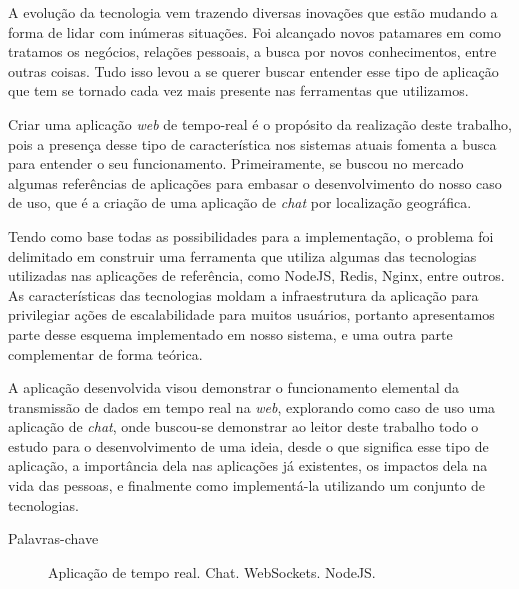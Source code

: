 \documentclass[brazil,ruledheader]{abntifes}
\begin{document}
	\begin{resumo}
		A evolução da tecnologia vem trazendo diversas inovações que estão mudando a forma de lidar com inúmeras situações. Foi alcançado novos patamares em como tratamos os negócios, relações pessoais, a busca por novos conhecimentos, entre outras coisas. Tudo isso levou a se querer buscar entender esse tipo de aplicação que tem se tornado cada vez mais presente nas ferramentas que utilizamos.
		
		Criar uma aplicação \textit{web} de tempo-real é o propósito da realização deste trabalho, pois a presença desse tipo de característica nos sistemas atuais fomenta a busca para entender o seu funcionamento. Primeiramente, se buscou no mercado algumas referências de aplicações para embasar o desenvolvimento do nosso caso de uso, que é a criação de uma aplicação de \textit{chat} por localização geográfica.
		
		Tendo como base todas as possibilidades para a implementação, o problema foi delimitado em construir uma ferramenta que utiliza algumas das tecnologias utilizadas nas aplicações de referência, como NodeJS, Redis, Nginx, entre outros. As características das tecnologias moldam a infraestrutura da aplicação para privilegiar ações de escalabilidade para muitos usuários, portanto apresentamos parte desse esquema implementado em nosso sistema, e uma outra parte complementar de forma teórica. 
		
		A aplicação desenvolvida visou demonstrar o funcionamento elemental da transmissão de dados em tempo real na \textit{web}, explorando como caso de uso uma aplicação de \textit{chat}, onde buscou-se demonstrar ao leitor deste trabalho todo o estudo para o desenvolvimento de uma ideia, desde o que significa esse tipo de aplicação, a importância dela nas aplicações já existentes, os impactos dela na vida das pessoas, e finalmente como implementá-la utilizando um conjunto de tecnologias.
		
		\begin{description}
			\item[Palavras-chave] Aplicação de tempo real. Chat. WebSockets. NodeJS. 
		\end{description}
		
	\end{resumo}
	
\end{document}
